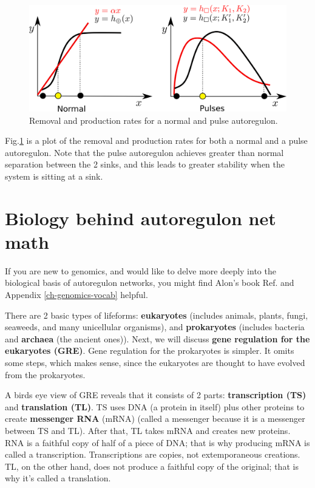 \begin{figure}[h!]
\centering
\includegraphics[width=4.7in]
{autoregulons/pulse-removal-production.png}
\caption{Removal and production rates for
a normal and pulse autoregulon.}
\label{fig-pulse-removal-production}
\end{figure}
Fig.\ref{fig-pulse-removal-production}
is a plot of the removal and production rates for both
a normal and a pulse autoregulon. Note
that the pulse autoregulon
achieves greater
than normal separation
between the 2 sinks, 
and this leads to greater stability 
when the system is sitting at a sink.



\section{Biology behind autoregulon net math}
\label{sec-bio-basis-ar}

If you are new to genomics, and would like to delve more deeply into the biological
basis of autoregulon networks, you might find
Alon's book Ref.\cite{alon-book} and Appendix \ref{ch-genomics-vocab} helpful.

There are 2 basic types of lifeforms: {\bf eukaryotes} (includes animals, plants, fungi, seaweeds, and many unicellular organisms), and {\bf prokaryotes} (includes bacteria and {\bf archaea} (the ancient ones)). Next,
we will discuss {\bf gene regulation 
for the eukaryotes (GRE)}.
Gene regulation for the   
prokaryotes is
simpler. It omits some steps,
which makes sense, since the eukaryotes are thought 
to have evolved from the
prokaryotes.

A birds eye view of GRE
reveals that it consists of 2 parts: {\bf transcription (TS)} and 
{\bf translation (TL)}. 
TS uses DNA (a protein in itself) plus other proteins to create {\bf messenger RNA} (mRNA) (called a messenger because it is a messenger between TS and TL). After that,
TL takes mRNA and creates 
new proteins.
RNA is a faithful copy of half
of a piece of DNA; that is why 
producing 
mRNA is called a transcription. Transcriptions are copies, not extemporaneous creations. TL, on the other 
hand, does not produce a faithful copy of the original; that is why it's called a translation.

